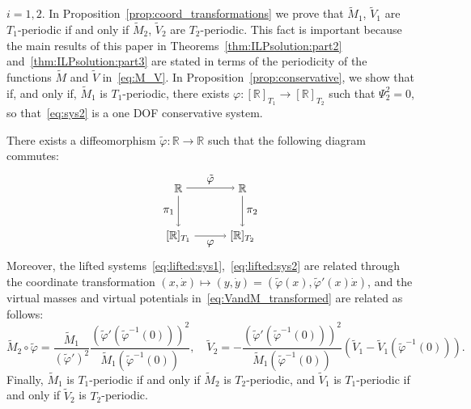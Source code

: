 $i=1,2$. In Proposition~\ref{prop:coord_transformations} we prove that
$\tilde M_1$, $\tilde V_1$ are $T_1$-periodic if and only if $\tilde
M_2$, $\tilde V_2$ are $T_2$-periodic.  This fact is important because
the main results of this paper in Theorems~\ref{thm:ILPsolution:part2}
and~\ref{thm:ILPsolution:part3} are stated in terms of the periodicity
of the functions $\tilde M$ and $\tilde V$ in~\eqref{eq:M_V}. In
Proposition~\ref{prop:conservative}, we show that if, and only if,
$\tilde M_1$ is $T_1$-periodic, there exists $\varphi: [\mathbb{R}]_{T_1} \to
[\mathbb{R}]_{T_2}$ such that $\Psi_2^2=0$, so that~\eqref{eq:sys2} is a one
DOF conservative system.
\begin{proposition}
	\label{prop:coord_transformations}
	There exists a diffeomorphism $\tilde \varphi: \mathbb{R} \to \mathbb{R}$ such that
	the following diagram commutes:
				\begin{equation}\label{eq:comm_diag:tildevarphi}
	\begin{tikzpicture}[node distance=1.5cm, auto,baseline=(current  bounding  box.center)]
	\node (R1) {$\mathbb{R}$};
	\node (R2) [node distance=2cm,right of=R1] {$\mathbb{R}$};
	\node (R1T1) [below of=R1] {$[\mathbb{R}]_{T_1}$};
	\node (R2T2) [below of=R2] {$[\mathbb{R}]_{T_2}$};
	\draw[->] (R1) to node {$\tilde \varphi$} (R2);
	\draw[->] (R1T1) to node [swap] {$\varphi$} (R2T2);
	\draw[->] (R1) to node [swap] {$\pi_1$} (R1T1);
	\draw[->] (R2) to node {$\pi_2$} (R2T2);
	\end{tikzpicture}
	\end{equation}
				Moreover, the lifted
	systems~\eqref{eq:lifted:sys1},~\eqref{eq:lifted:sys2} are related
	through the coordinate transformation $(x,\dot x) \mapsto (y,\dot y) =
	(\tilde \varphi(x),\tilde \varphi'(x) \dot x)$, and the virtual masses
	and virtual potentials in~\eqref{eq:VandM_transformed} are related as
	follows:
				\begin{equation}\label{eq:M1_M2_V1_V2}
	\tilde M_2 \circ \tilde \varphi= \frac{\tilde M_1}{(\tilde
		\varphi')^2} \frac{(\tilde \varphi'(\tilde
		\varphi^{-1}(0)))^2}{\tilde M_1(\tilde \varphi^{-1}(0))}, \quad
		\tilde V_2 = - \frac{(\tilde \varphi'(\tilde
		\varphi^{-1}(0)))^2}{\tilde M_1(\tilde \varphi^{-1}(0))} \left(
	\tilde V_1 - \tilde V_1(\tilde \varphi^{-1}(0)) \right).
	\end{equation}
				Finally, $\tilde M_1$ is $T_1$-periodic if and only if $\tilde M_2$ is
	$T_2$-periodic, and $\tilde V_1$ is $T_1$-periodic if and only if
	$\tilde V_2$ is $T_2$-periodic.
\end{proposition}
